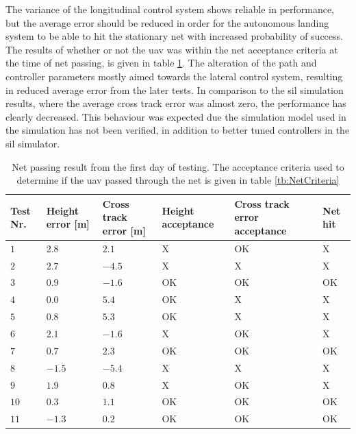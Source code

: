 The variance of the longitudinal control system shows reliable in performance, but the average error should be reduced in order for the autonomous landing system to be able to hit the stationary net with increased probability of success. The results of whether or not the \gls{uav} was within the net acceptance criteria at the time of net passing, is given in table \ref{tb:Day1LandingAttempt}. The alteration of the path and controller parameters mostly aimed towards the lateral control system, resulting in reduced average error from the later tests. In comparison to the \gls{sil} simulation results, where the average cross track error was almost zero, the performance has clearly decreased. This behaviour was expected due the simulation model used in the simulation has not been verified, in addition to better tuned controllers in the \gls{sil} simulator.
\begin{table}[H]
\centering
\begin{tabular}{| p{0.5cm} | p{1cm} | p{1cm} | p{3.5cm} | p{3cm} | p{1cm} |}
\hline
\textbf{Test Nr.}	& \textbf{Height error [m]}	& \textbf{Cross track error [m]}& \textbf{Height acceptance}& \textbf{Cross track error acceptance}	& \textbf{Net hit}\\ \hline
$1$				& $2.8$		& $2.1$		& X								& OK									& X					\\ \hline
$2$				& $2.7$		& $-4.5$	& X								& X										& X					\\ \hline
$3$				& $0.9$		& $-1.6$	& OK							& OK									& OK				\\ \hline
$4$				& $0.0$		& $5.4$		& OK							& X										& X					\\ \hline
$5$				& $0.8$		& $5.3$		& OK							& X										& X					\\ \hline
$6$				& $2.1$		& $-1.6$	& X								& OK									& X					\\ \hline
$7$				& $0.7$		& $2.3$		& OK							& OK									& OK				\\ \hline
$8$				& $-1.5$	& $-5.4$	& X								& X										& X					\\ \hline
$9$				& $1.9$		& $0.8$		& X								& OK									& X					\\ \hline
$10$			& $0.3$	& $1.1$		& OK							& OK									& OK				\\ \hline
$11$			& $-1.3$	& $0.2$		& OK							& OK									& OK				\\ \hline
\end{tabular}
\caption{Net passing result from the first day of testing. The acceptance criteria used to determine if the \gls{uav} passed through the net is given in table \ref{tb:NetCriteria}}
\label{tb:Day1LandingAttempt}
\end{table}
